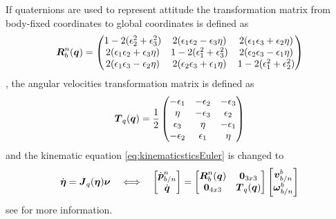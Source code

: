 If quaternions are used to represent attitude the transformation matrix from body-fixed coordinates to global coordinates is defined as 
\begin{equation}
\boldsymbol{R}^n_b(\boldsymbol{q}) = \begin{pmatrix}
  1 - 2(\epsilon_2^2 + \epsilon_3^2) & 2(\epsilon_1\epsilon_2 - \epsilon_3\eta)   & 2(\epsilon_1\epsilon_3 + \epsilon_2\eta) \\
     2(\epsilon_1\epsilon_2 + \epsilon_3\eta) &  1-2(\epsilon_1^2 + \epsilon_3^2) & 2(\epsilon_2\epsilon_3-\epsilon_1\eta)    \\
     2(\epsilon_1\epsilon_3 - \epsilon_2\eta) &  2(\epsilon_2\epsilon_3 + \epsilon_1\eta)  & 1-2(\epsilon_1^2 + \epsilon_2^2) \\
\end{pmatrix}
\end{equation}, the angular velocities transformation matrix is defined as
\begin{equation} \label{eq:Tquat}
\boldsymbol{T}_q(\boldsymbol{q}) = \frac{1}{2}
\begin{pmatrix}
-\epsilon_1  & -\epsilon_2  & -\epsilon_3 \\
\eta   & -\epsilon_3 & \epsilon_2 \\
\epsilon_3 & \eta    &  -\epsilon_1 \\
-\epsilon_2 & \epsilon_1    & \eta \\
\end{pmatrix}
\end{equation}
and the kinematic equation \eqref{eq:kinematicsticsEuler} is changed to 
\begin{equation}
\dot{\boldsymbol{\eta}} = \boldsymbol{J}_q(\boldsymbol{\eta})\boldsymbol{\nu}
\quad\Longleftrightarrow\quad
\begin{bmatrix}
\dot{\boldsymbol{p}}^n_{b/n} \\
\dot{\boldsymbol{q}}
\end{bmatrix}
=
\begin{bmatrix}
\boldsymbol{R}^n_b(\boldsymbol{q}) & \boldsymbol{0}_{3x3} \\
\boldsymbol{0}_{4x3} & \boldsymbol{T}_q(\boldsymbol{q})
\end{bmatrix}
\begin{bmatrix}
\boldsymbol{v}^b_{b/n} \\
\boldsymbol{\omega}^b_{b/n}
\end{bmatrix}
\end{equation}
see \citet[Ch. 2]{fossen2011} for more information. 
